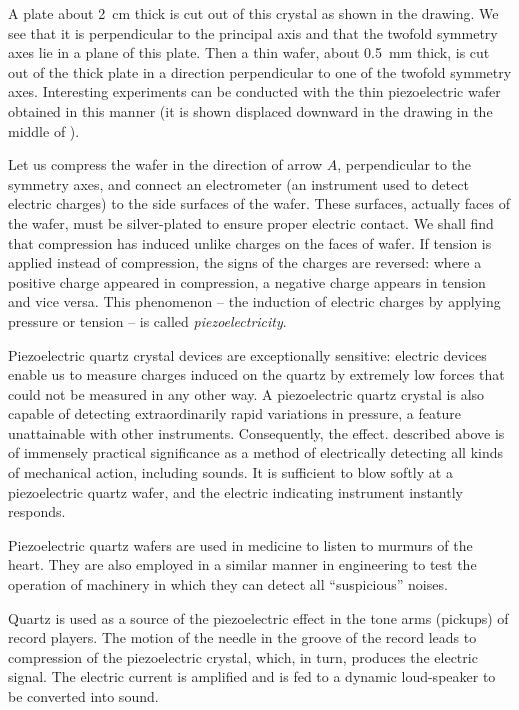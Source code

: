 A plate about \SI{2}{\centi\meter} thick is cut out of this crystal as shown in the drawing. We see that it is perpendicular to the principal axis and that the twofold symmetry axes lie in a plane of this plate. Then a thin wafer, about \SI{0.5}{\milli\meter} thick, is cut out of the thick plate in a direction perpendicular to one of the twofold symmetry axes. Interesting experiments can be conducted with the thin piezoelectric wafer obtained in this manner (it is shown displaced downward in the drawing in the middle of ).

Let us compress the wafer in the direction of arrow $A$, perpendicular to the symmetry axes, and connect an electrometer (an instrument used to detect electric charges) to the side surfaces of the wafer. These surfaces, actually faces of the wafer, must be silver-plated to ensure proper electric contact. We shall find that compression has induced unlike charges on the faces of wafer. If tension is applied instead of compression, the signs of the charges are reversed: where a positive charge appeared in compression, a negative charge appears in tension and vice versa. This phenomenon -- the induction of electric charges by applying pressure or tension -- is called \emph{piezoelectricity}.

Piezoelectric quartz crystal devices are exceptionally sensitive: electric devices enable us to measure charges induced on the quartz by extremely low forces that could not be measured in any other way. A piezoelectric quartz crystal is also capable of detecting extraordinarily rapid variations in pressure, a feature unattainable with other instruments. Consequently, the effect. described above is of immensely practical significance as a method of electrically detecting all kinds of mechanical action, including sounds. It is sufficient to blow softly at a piezoelectric quartz wafer, and the electric indicating instrument instantly responds.

Piezoelectric quartz wafers are used in medicine to listen to murmurs of the heart. They are also employed in a similar manner in engineering to test the operation of machinery in which they can detect all ``suspicious'' noises.

Quartz is used as a source of the piezoelectric effect in the tone arms (pickups) of record players. The motion of the needle in the groove of the record leads to compression of the piezoelectric crystal, which, in turn, produces the electric signal. The electric current is amplified and is fed to a dynamic loud-speaker to be converted into sound.

